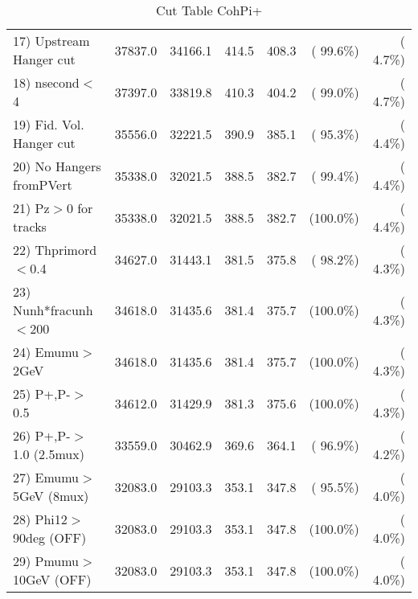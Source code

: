 \begin{table}[h!]
\begin{tabular}{||l||r|r|r|r|r|r||}
 17) Upstream Hanger cut  &      37837.0 &      34166.1 &        414.5 &        408.3 & ( 99.6\%) & (  4.7\%) \\
 18) nsecond$<$4          &      37397.0 &      33819.8 &        410.3 &        404.2 & ( 99.0\%) & (  4.7\%) \\
 19) Fid. Vol. Hanger cut &      35556.0 &      32221.5 &        390.9 &        385.1 & ( 95.3\%) & (  4.4\%) \\
 20) No Hangers fromPVert &      35338.0 &      32021.5 &        388.5 &        382.7 & ( 99.4\%) & (  4.4\%) \\
 21) Pz$>$0 for tracks    &      35338.0 &      32021.5 &        388.5 &        382.7 & (100.0\%) & (  4.4\%) \\
 22) Thprimord$<$0.4      &      34627.0 &      31443.1 &        381.5 &        375.8 & ( 98.2\%) & (  4.3\%) \\
 23) Nunh*fracunh$<$200   &      34618.0 &      31435.6 &        381.4 &        375.7 & (100.0\%) & (  4.3\%) \\
 24) Emumu$>$2GeV         &      34618.0 &      31435.6 &        381.4 &        375.7 & (100.0\%) & (  4.3\%) \\
 25) P+,P-$>$0.5          &      34612.0 &      31429.9 &        381.3 &        375.6 & (100.0\%) & (  4.3\%) \\
 26) P+,P-$>$1.0 (2.5mux) &      33559.0 &      30462.9 &        369.6 &        364.1 & ( 96.9\%) & (  4.2\%) \\
 27) Emumu$>$5GeV  (8mux) &      32083.0 &      29103.3 &        353.1 &        347.8 & ( 95.5\%) & (  4.0\%) \\
 28) Phi12$>$90deg  (OFF) &      32083.0 &      29103.3 &        353.1 &        347.8 & (100.0\%) & (  4.0\%) \\
 29) Pmumu$>$10GeV  (OFF) &      32083.0 &      29103.3 &        353.1 &        347.8 & (100.0\%) & (  4.0\%) \\
 \hline
 \hline
 \end{tabular}
 \caption{Cut Table  CohPi+   }
 \label{tab-cutcohjpsi-mumu_cohpip}
 \end{table}
